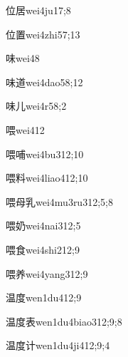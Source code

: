 \begin{verbete}{位居}{wei4ju1}{7;8}
\end{verbete}
\begin{verbete}{位置}{wei4zhi5}{7;13}
\end{verbete}
\begin{verbete}{味}{wei4}{8}
\end{verbete}
\begin{verbete}{味道}{wei4dao5}{8;12}
\end{verbete}
\begin{verbete}{味儿}{wei4r5}{8;2}
\end{verbete}
\begin{verbete}{喂}{wei4}{12}
\end{verbete}
\begin{verbete}{喂哺}{wei4bu3}{12;10}
\end{verbete}
\begin{verbete}{喂料}{wei4liao4}{12;10}
\end{verbete}
\begin{verbete}{喂母乳}{wei4mu3ru3}{12;5;8}
\end{verbete}
\begin{verbete}{喂奶}{wei4nai3}{12;5}
\end{verbete}
\begin{verbete}{喂食}{wei4shi2}{12;9}
\end{verbete}
\begin{verbete}{喂养}{wei4yang3}{12;9}
\end{verbete}
\begin{verbete}{温度}{wen1du4}{12;9}
\end{verbete}
\begin{verbete}{温度表}{wen1du4biao3}{12;9;8}
\end{verbete}
\begin{verbete}{温度计}{wen1du4ji4}{12;9;4}
\end{verbete}
